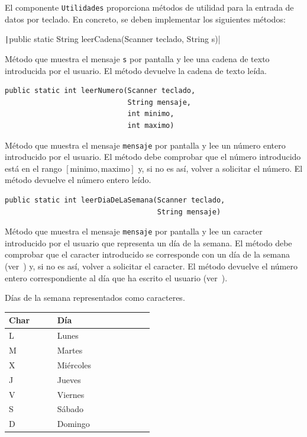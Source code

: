 \documentclass[
    a4paper, %
    12pt, %
]{CSSullivanBusinessReport}
\begin{document}
El componente \texttt{Utilidades} proporciona métodos de utilidad para la entrada de datos por teclado. En concreto, se deben implementar los siguientes métodos:

\texttt|public static String leerCadena(Scanner teclado, String s)|

Método que muestra el mensaje \texttt{s} por pantalla y lee una cadena de texto introducida por el usuario. El método devuelve la cadena de texto leída.

\begin{verbatim}
public static int leerNumero(Scanner teclado,
                             String mensaje,
                             int minimo,
                             int maximo)
\end{verbatim}

Método que muestra el mensaje \texttt{mensaje} por pantalla y lee un número entero introducido por el usuario. El método debe comprobar que el número introducido está en el rango \(\left [\mathrm{minimo},\mathrm{maximo}\right ]\) y, si no es así, volver a solicitar el número. El método devuelve el número entero leído.

\begin{verbatim}
public static int leerDiaDeLaSemana(Scanner teclado,
                                    String mensaje)
\end{verbatim}

Método que muestra el mensaje \texttt{mensaje} por pantalla y lee un caracter introducido por el usuario que representa un día de la semana. El método debe comprobar que el caracter introducido se corresponde con un día de la semana (ver~) y, si no es así, volver a solicitar el caracter. El método devuelve el número entero correspondiente al día que ha escrito el usuario (ver~).

\begin{margintable}
    \footnotesize
    \caption{Días de la semana representados como caracteres.}\label{tab:char-semana}
    \begin{tabular}{C{0.2\linewidth} L{0.4\linewidth}}
        \toprule
        \textbf{Char} & \textbf{Día}\\
        \midrule
        L & Lunes\\
        M & Martes\\
        X & Miércoles\\
        J & Jueves\\
        V & Viernes\\
        S & Sábado\\
        D & Domingo\\
        \bottomrule
    \end{tabular}
\end{margintable}
\end{document}
